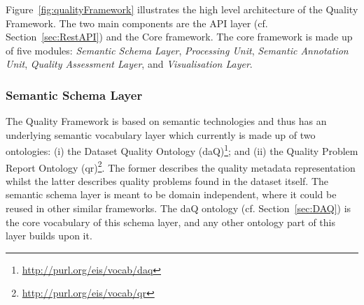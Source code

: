 Figure~\ref{fig:qualityFramework} illustrates the high level architecture of the Quality Framework.
The two main components are the API layer (cf. Section~\ref{sec:RestAPI}) and the Core framework.
The core framework is made up of five modules: \emph{Semantic Schema Layer}, \emph{Processing Unit}, \emph{Semantic Annotation Unit}, \emph{Quality Assessment Layer}, and \emph{Visualisation Layer}.

\subsubsection{Semantic Schema Layer}
The Quality Framework is based on semantic technologies and thus has an underlying semantic vocabulary layer which currently is made up of two ontologies: (i) the Dataset Quality Ontology (daQ)\footnote{\url{http://purl.org/eis/vocab/daq}}; and (ii) the Quality Problem Report Ontology (qr)\footnote{\url{http://purl.org/eis/vocab/qr}}. 
The former describes the quality metadata representation whilst the latter describes quality problems found in the dataset itself. 
The semantic schema layer is meant to be domain independent, where it could be reused in other similar frameworks. 
The daQ ontology (cf. Section~\ref{sec:DAQ}) is the core vocabulary of this schema layer, and any other ontology part of this layer builds upon it.

